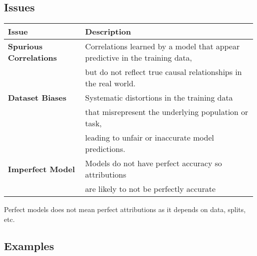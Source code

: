 \subsection{Issues}
\begin{summary}
    \begin{center}
        \begin{tabular}{ll}
            \toprule
            \textbf{Issue} & \textbf{Description} \\
            \midrule
            \textbf{Spurious Correlations} & Correlations learned by a model that appear predictive in the training data, \\
            & but do not reflect true causal relationships in the real world. \\
            \midrule
            \textbf{Dataset Biases} & Systematic distortions in the training data \\
            & that misrepresent the underlying population or task, \\
            & leading to unfair or inaccurate model predictions. \\
            \midrule
            \textbf{Imperfect Model} & Models do not have perfect accuracy so attributions \\
            & are likely to not be perfectly accurate \\
            \bottomrule
        \end{tabular}
    \end{center}
\end{summary}

\begin{warning}
    Perfect models does not mean perfect attributions as it depends on data, splits, etc. 
\end{warning}
\newpage

\subsection{Examples}
